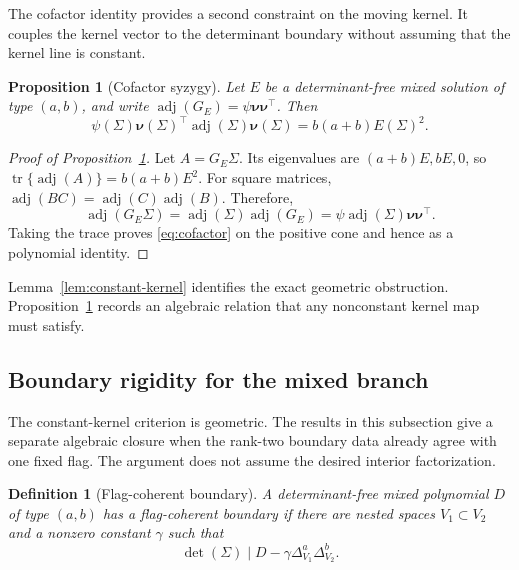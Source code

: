 \documentclass[12pt,a4paper]{article}
\theoremstyle{plain}
\newtheorem{proposition}{Proposition}
\newtheorem{definition}{Definition}
\theoremstyle{definition}
\newcommand{\tr}{\operatorname{tr}}
\newcommand{\adjm}{\operatorname{adj}}
\newcommand{\knu}{\boldsymbol{\nu}}
\begin{document}
The cofactor identity provides a second constraint on the moving kernel.
It couples the kernel vector to the determinant boundary without assuming that the kernel line is constant.

\begin{proposition}[Cofactor syzygy]
\label{prop:cofactor}
    Let $E$ be a determinant-free mixed solution of type $(a,b)$, and write $\adjm(G_E)=\psi\knu\knu^\top$.
    Then
    \begin{equation}
    \label{eq:cofactor}
        \psi(\Sigma)\knu(\Sigma)^\top\adjm(\Sigma)\knu(\Sigma)
        =
        b(a+b)E(\Sigma)^2
        .
    \end{equation}
\end{proposition}

\begin{proof}[Proof of Proposition~\ref{prop:cofactor}]
    Let $A=G_E\Sigma$.
    Its eigenvalues are $(a+b)E,bE,0$, so $\tr\{\adjm(A)\}=b(a+b)E^2$.
    For square matrices, $\adjm(BC)=\adjm(C)\adjm(B)$.
    Therefore,
    \begin{equation*}
        \adjm(G_E\Sigma)
        =
        \adjm(\Sigma)\adjm(G_E)
        =
        \psi\adjm(\Sigma)\knu\knu^\top
        .
    \end{equation*}
    Taking the trace proves \eqref{eq:cofactor} on the positive cone and hence as a polynomial identity.
\end{proof}

Lemma~\ref{lem:constant-kernel} identifies the exact geometric obstruction.
Proposition~\ref{prop:cofactor} records an algebraic relation that any nonconstant kernel map must satisfy.

\subsection{Boundary rigidity for the mixed branch}
\label{supp:d3-boundary-rigidity}

The constant-kernel criterion is geometric.
The results in this subsection give a separate algebraic closure when the rank-two boundary data already agree with one fixed flag.
The argument does not assume the desired interior factorization.

\begin{definition}[Flag-coherent boundary]
\label{def:boundary-coherent}
    A determinant-free mixed polynomial $D$ of type $(a,b)$ has a flag-coherent boundary if there are nested spaces $V_1\subset V_2$ and a nonzero constant $\gamma$ such that
    \begin{equation}
    \label{eq:boundary-coherent}
        \det(\Sigma)\mid D-\gamma\Delta_{V_1}^a\Delta_{V_2}^b
        .
    \end{equation}
\end{definition}
\end{document}
